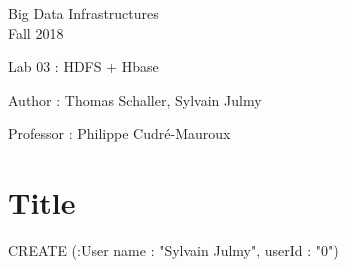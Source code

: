 \documentclass[a4paper,11pt]{report}
\date{\today}
\begin{document}
\begin{center}
\Large{
    Big Data Infrastructures\\
    Fall 2018
  }
  
  \noindent\makebox[\linewidth]{\rule{\linewidth}{0.4pt}}
  Lab 03 : HDFS + Hbase

  \vspace*{1.4cm}

  Author : Thomas Schaller, Sylvain Julmy
  \noindent\makebox[\linewidth]{\rule{\linewidth}{0.4pt}}

  \begin{flushleft}
    Professor : Philippe Cudré-Mauroux
  \end{flushleft}

  \noindent\makebox[\linewidth]{\rule{\textwidth}{1pt}}
\end{center}

\section*{Title}

CREATE (:User {name : "Sylvain Julmy", userId : "0"})
\end{document}
